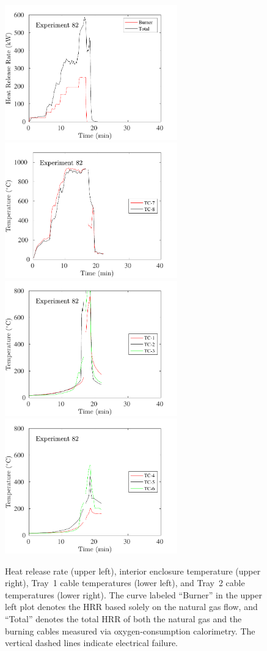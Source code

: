 \begin{figure}[H]
\includegraphics[height=2.30in]{../SCRIPT_FIGURES/Test_82_HRR} \hfill
\includegraphics[height=2.30in]{../SCRIPT_FIGURES/Test_82_TC_7-8} \\
\includegraphics[height=2.30in]{../SCRIPT_FIGURES/Test_82_TC_1-3} \hfill
\includegraphics[height=2.30in]{../SCRIPT_FIGURES/Test_82_TC_4-6}
\caption[HRR and temperatures of Experiment 82]{Heat release rate (upper left), interior enclosure temperature (upper right), Tray~1 cable temperatures (lower left), and Tray~2 cable temperatures (lower right). The curve labeled ``Burner'' in the upper left plot denotes the HRR based solely on the natural gas flow, and ``Total'' denotes the total HRR of both the natural gas and the burning cables measured via oxygen-consumption calorimetry. The vertical dashed lines indicate electrical failure.}
\label{fig:Test_82}
\end{figure}

